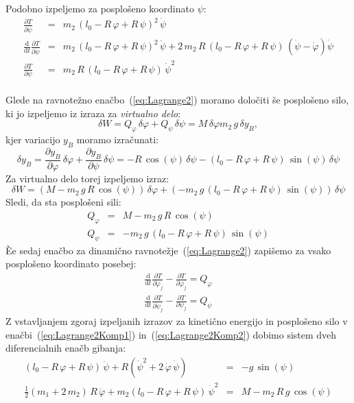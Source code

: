 Podobno izpeljemo za posplošeno koordinato $\psi$:
\begin{eqnarray}\label{eq:dPosp2}
  \frac{\partial T}{\partial \dot{\psi}}&=&
  m_2\,(l_0-R\,\varphi+R\,\psi)^2\,\dot{\psi}\\
%
  \frac{\textrm{d}}{\textrm{d}t}
  \frac{\partial T}{\partial \dot{\psi}}&=&
  m_2\,(l_0-R\,\varphi+R\,\psi)^2\,\ddot{\psi}+
  2\,m_2\,R\,(l_0-R\,\varphi+R\,\psi)\,(\dot{\psi}-\dot{\varphi})\dot{\psi}\\
%
  \frac{\partial T}{\partial \psi}&=&
  m_2\,R\,(l_0-R\,\varphi+R\,\psi)\,\dot{\psi}^2\\
\end{eqnarray}

Glede na ravnotežno enačbo~(\ref{eq:Lagrange2}) moramo določiti še
posplošeno silo, ki jo izpeljemo iz izraza za \emph{virtualno
delo}:
\begin{equation}\label{eq:W}
  \delta W=
   Q_{\varphi}\,\delta \varphi
  +Q_{\psi}\,\delta \psi=
   M\,\delta \varphi
   m_2\,g\,\delta y_B,
\end{equation}
kjer variacijo $y_B$ moramo izračunati:
\begin{equation}\label{eq:varYB}
  \delta y_B=
              \frac{\partial y_B}{\partial \varphi} \,\delta \varphi
              +\frac{\partial y_B}{\partial \psi} \,\delta \psi
            =
            -R\,\cos(\psi)\,\delta \psi
            -(l_0-R\,\varphi+R\,\psi)\,\sin(\psi)\,\delta \psi
\end{equation}
Za virtualno delo torej izpeljemo izraz:
\begin{equation}\label{eq:WIzpel}
  \delta W=
    (M-m_2\,g\,R\,\cos(\psi))\,\delta \varphi
   +(-m_2\,g\,(l_0-R\,\varphi+R\,\psi)\,\sin(\psi))\,\delta \psi
\end{equation}
Sledi, da sta posplošeni sili:
\begin{eqnarray}\label{eq:Q}
  Q_{\varphi} &=&M-m_2\,g\,R\,\cos(\psi)\\
  Q_{\psi}&=&-m_2\,g\,(l_0-R\,\varphi+R\,\psi)\,\sin(\psi)
\end{eqnarray}
Èe sedaj enačbo za dinamično ravnotežje~(\ref{eq:Lagrange2})
zapišemo za vsako posplošeno koordinato posebej:
\begin{eqnarray}\label{eq:Lagrange2Komp1}
  \frac{\textrm{d}}{\textrm{d}t}
  \frac{\partial T}{\partial \dot{\varphi}_j}-
  \frac{\partial T}{\partial \varphi_j}
  =
  Q_{\varphi}\\\label{eq:Lagrange2Komp2}
  \frac{\textrm{d}}{\textrm{d}t}
  \frac{\partial T}{\partial \dot{\psi}_j}-
  \frac{\partial T}{\partial \psi_j}
  =
  Q_{\psi}
\end{eqnarray}
Z vstavljanjem zgoraj izpeljanih izrazov za kinetično energijo in
posplošeno silo v enačbi~(\ref{eq:Lagrange2Komp1})
in~(\ref{eq:Lagrange2Komp2}) dobimo sistem dveh diferencialnih
enačb gibanja:
\begin{eqnarray}\label{eq:resitev}
   (l_0-R\,\varphi+R\,\psi)\,\ddot{\psi}
  +R(\dot{\psi}^2+2\,\dot{\varphi}\,\dot{\psi})
  &=&
  -g\, \sin(\psi)\\
   \frac{1}{2}(m_1+2\,m_2)\,R\,\ddot{\varphi}
  +m_2(l_0-R\,\varphi+R\,\psi)\,\dot{\psi}^2
  &=&
  M-m_2\,R\,g\,\cos(\psi)
\end{eqnarray}
